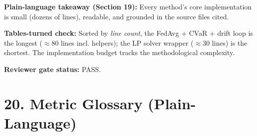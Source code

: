 \documentclass{article}
\begin{document}
\textbf{Plain-language takeaway (Section 19):} Every method's core implementation is small (dozens of lines), readable, and grounded in the source files cited.


\textbf{Tables-turned check:} Sorted by \emph{line count}, the FedAvg + CVaR + drift loop is the longest (\ensuremath{\approx}80 lines incl. helpers); the LP solver wrapper (\ensuremath{\approx}30 lines) is the shortest. The implementation budget tracks the methodological complexity.


\textbf{Reviewer gate status:} PASS.



\clearpage
\section{20. Metric Glossary (Plain-Language)}
\end{document}
